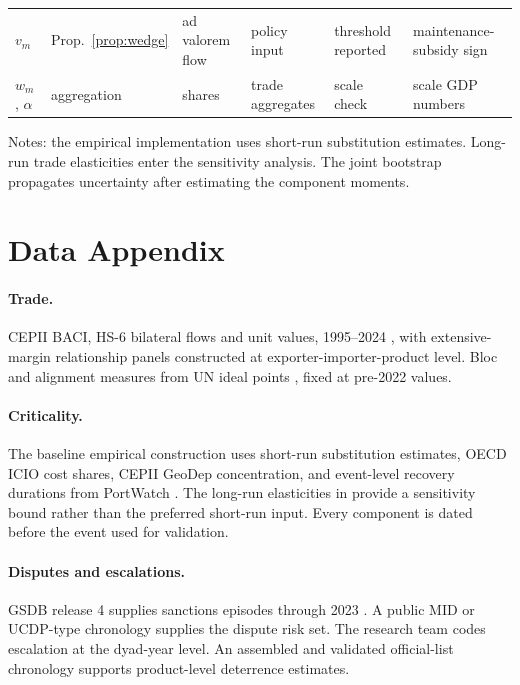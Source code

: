 \documentclass[11pt]{article}
\theoremstyle{definition}
\begin{document}
\begin{table}[h]
\begin{tabular}{p{2.2cm}p{1.7cm}p{1.5cm}p{2.9cm}p{1.9cm}p{3.2cm}}
$v_m$ & Prop.~\ref{prop:wedge} & ad valorem flow & policy input & threshold reported & maintenance-subsidy sign \\
$w_m$, $\alpha$ & aggregation & shares & trade aggregates & scale check & scale GDP numbers \\
\bottomrule
\end{tabular}
\par\smallskip
\begin{minipage}{0.95\textwidth}
\footnotesize Notes: the empirical implementation uses short-run substitution estimates. Long-run trade elasticities enter the sensitivity analysis. The joint bootstrap propagates uncertainty after estimating the component moments.
\end{minipage}
\end{table}

\section{Data Appendix}\label{app:data}

\paragraph{Trade.} CEPII BACI, HS-6 bilateral flows and unit values, 1995--2024 \citep{CEPIIBACI}, with extensive-margin relationship panels constructed at exporter-importer-product level. Bloc and alignment measures from UN ideal points \citep{BaileyStrezhnevVoeten2017}, fixed at pre-2022 values.

\paragraph{Criticality.} The baseline empirical construction uses short-run substitution estimates, OECD ICIO cost shares, CEPII GeoDep concentration, and event-level recovery durations from PortWatch \citep{OECDICIO,CEPIIGeoDep,IMFPortWatch}. The long-run elasticities in \citet{BrodaWeinstein2006} provide a sensitivity bound rather than the preferred short-run input. Every component is dated before the event used for validation.

\paragraph{Disputes and escalations.} GSDB release 4 supplies sanctions episodes through 2023 \citep{GSDBRelease4}. A public MID or UCDP-type chronology supplies the dispute risk set. The research team codes escalation at the dyad-year level. An assembled and validated official-list chronology supports product-level deterrence estimates.
\end{document}
